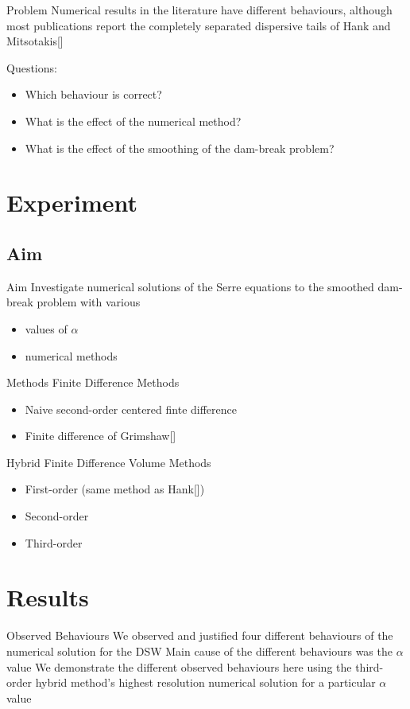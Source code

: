 \documentclass[pdf]{beamer}
\begin{document}
\begin{frame}{Problem}
	Numerical results in the literature have different behaviours, although most publications report the completely separated dispersive tails of Hank and Mitsotakis[]
	
	Questions:
	\begin{itemize}
		\item Which behaviour is correct?
		\item What is the effect of the numerical method?
		\item What is the effect of the smoothing of the dam-break problem?
	\end{itemize}
\end{frame}

\section{Experiment}
\subsection{Aim}
\begin{frame}{Aim}
	Investigate numerical solutions of the Serre equations to the smoothed dam-break problem with various
	\begin{itemize}
		\item values of $\alpha$
		\item numerical methods
	\end{itemize}
\end{frame}

\begin{frame}{Methods}
	Finite Difference Methods
	\begin{itemize}
		\item Naive second-order centered finte difference
		\item Finite difference of Grimshaw[]
	\end{itemize}
	Hybrid Finite Difference Volume Methods
	\begin{itemize}
		\item First-order (same method as Hank[])
		\item Second-order 
		\item Third-order 
	\end{itemize}
\end{frame}

\section{Results}
\begin{frame}{Observed Behaviours}
	We observed and justified four different behaviours of the numerical solution for the DSW \newline \newline
	Main cause of the different behaviours was the $\alpha$ value \newline \newline
	We demonstrate the different observed behaviours here using the third-order hybrid method's highest resolution numerical solution for a particular $\alpha$ value
\end{frame}
\end{document}

